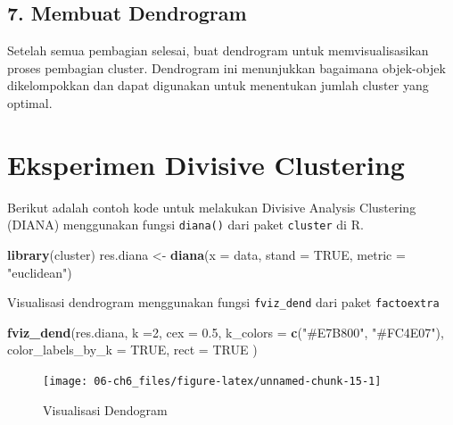 \documentclass[
  oneside]{book}
\newenvironment{Shaded}{\begin{snugshade}}{\end{snugshade}}
\newcommand{\AttributeTok}[1]{\textcolor[rgb]{0.13,0.29,0.53}{#1}}
\newcommand{\ConstantTok}[1]{\textcolor[rgb]{0.56,0.35,0.01}{#1}}
\newcommand{\DecValTok}[1]{\textcolor[rgb]{0.00,0.00,0.81}{#1}}
\newcommand{\FloatTok}[1]{\textcolor[rgb]{0.00,0.00,0.81}{#1}}
\newcommand{\FunctionTok}[1]{\textcolor[rgb]{0.13,0.29,0.53}{\textbf{#1}}}
\newcommand{\NormalTok}[1]{#1}
\newcommand{\OtherTok}[1]{\textcolor[rgb]{0.56,0.35,0.01}{#1}}
\newcommand{\StringTok}[1]{\textcolor[rgb]{0.31,0.60,0.02}{#1}}
\begin{document}
\subsection*{7. Membuat Dendrogram}\label{membuat-dendrogram-1}

Setelah semua pembagian selesai, buat dendrogram untuk memvisualisasikan proses pembagian cluster. Dendrogram ini menunjukkan bagaimana objek-objek dikelompokkan dan dapat digunakan untuk menentukan jumlah cluster yang optimal.

\section{Eksperimen Divisive Clustering}\label{eksperimen-divisive-clustering}

Berikut adalah contoh kode untuk melakukan Divisive Analysis Clustering (DIANA) menggunakan fungsi \texttt{diana()} dari paket \texttt{cluster} di R.

\begin{Shaded}
\begin{Highlighting}[]
\FunctionTok{library}\NormalTok{(cluster)}
\NormalTok{res.diana }\OtherTok{\textless{}{-}} \FunctionTok{diana}\NormalTok{(}\AttributeTok{x =}\NormalTok{ data, }
                   \AttributeTok{stand =} \ConstantTok{TRUE}\NormalTok{, }
                   \AttributeTok{metric =} \StringTok{"euclidean"}\NormalTok{)}
\end{Highlighting}
\end{Shaded}

Visualisasi dendrogram menggunakan fungsi \texttt{fviz\_dend} dari paket \texttt{factoextra}

\begin{Shaded}
\begin{Highlighting}[]
\FunctionTok{fviz\_dend}\NormalTok{(res.diana, }\AttributeTok{k =}\DecValTok{2}\NormalTok{, }
          \AttributeTok{cex =} \FloatTok{0.5}\NormalTok{, }
          \AttributeTok{k\_colors =} \FunctionTok{c}\NormalTok{(}\StringTok{"\#E7B800"}\NormalTok{, }\StringTok{"\#FC4E07"}\NormalTok{),}
          \AttributeTok{color\_labels\_by\_k =} \ConstantTok{TRUE}\NormalTok{, }
          \AttributeTok{rect =} \ConstantTok{TRUE} 
\NormalTok{          )}
\end{Highlighting}
\end{Shaded}

\begin{figure}[h]

{\centering \texttt{[image: 06-ch6\_files/figure-latex/unnamed-chunk-15-1]} 

}

\caption{Visualisasi Dendogram}\label{fig:unnamed-chunk-15}
\end{figure}
\end{document}
